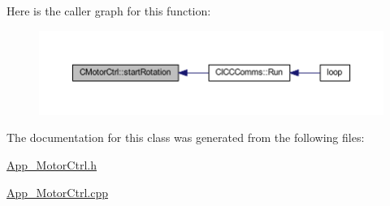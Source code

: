 Here is the caller graph for this function\+:
\nopagebreak
\begin{figure}[H]
\begin{center}
\leavevmode
\includegraphics[width=350pt]{class_c_motor_ctrl_a1ee991f9511437a2e64ee75161063020_icgraph}
\end{center}
\end{figure}


The documentation for this class was generated from the following files\+:\begin{DoxyCompactItemize}
\item 
\mbox{\hyperlink{_app___motor_ctrl_8h}{App\+\_\+\+Motor\+Ctrl.\+h}}\item 
\mbox{\hyperlink{_app___motor_ctrl_8cpp}{App\+\_\+\+Motor\+Ctrl.\+cpp}}\end{DoxyCompactItemize}
